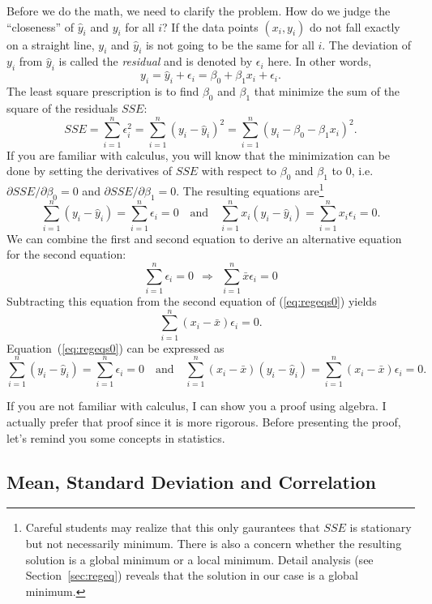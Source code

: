 \documentclass[11pt]{article}
\newcommand{\beq}{\begin{equation}}
\newcommand{\eeq}{\end{equation}}
\begin{document}
Before we do the math, we need to clarify the problem. How do we judge the 
``closeness'' of $\hat{y}_i$ and $y_i$ for all $i$? If the data points 
$(x_i,y_i)$ do not fall exactly on a straight line, $y_i$ and $\hat{y}_i$ 
is not going to be the same for all $i$. The deviation of $y_i$ from 
$\hat{y}_i$ is called the {\it residual} and is denoted by $\epsilon_i$ 
here. In other words, 
\beq
  y_i = \hat{y}_i + \epsilon_i = \beta_0 + \beta_1 x_i + \epsilon_i  .
\label{def:residual}
\eeq
The least square prescription is to find $\beta_0$ and $\beta_1$ that 
minimize the sum of the square of the residuals $SSE$: 
\beq
  SSE = \sum_{i=1}^n \epsilon_i^2 = \sum_{i=1}^n (y_i-\hat{y}_i)^2 
= \sum_{i=1}^n (y_i-\beta_0-\beta_1 x_i)^2 .
\label{def:SSE}
\eeq
If you are familiar with calculus, you will know that the minimization can be 
done by setting the derivatives of $SSE$ with respect to $\beta_0$ and 
$\beta_1$ to 0, i.e.\ $\partial SSE/\partial \beta_0 =0$ and 
$\partial SSE/\partial \beta_1=0$. The resulting equations 
are\footnote{Careful students may realize 
that this only gaurantees that $SSE$ is stationary but not necessarily minimum. There is also 
a concern whether the resulting solution is a global minimum or a local minimum. Detail 
analysis (see Section~\ref{sec:regeq}) reveals that the solution in our case is a global minimum.}  
\beq
  \sum_{i=1}^n (y_i-\hat{y}_i) = \sum_{i=1}^n \epsilon_i = 0 \ \ \ \mbox{ and } \ \ \ 
  \sum_{i=1}^n x_i (y_i-\hat{y}_i) = \sum_{i=1}^n x_i \epsilon_i = 0 .
\label{eq:regeqs0}
\eeq
We can combine the first and second equation to derive an alternative equation for 
the second equation: 
\[
  \sum_{i=1}^n \epsilon_i = 0 \ \ \Rightarrow \ \ 
  \sum_{i=1}^n \bar{x} \epsilon_i = 0 
\]
Subtracting this equation from the second equation of (\ref{eq:regeqs0}) yields 
\[
  \sum_{i=1}^n (x_i-\bar{x}) \epsilon_i = 0 .
\]
Equation~(\ref{eq:regeqs0}) can be expressed as 
\beq
  \sum_{i=1}^n (y_i-\hat{y}_i) = \sum_{i=1}^n \epsilon_i = 0 \ \ \ \mbox{ and } \ \ \ 
  \sum_{i=1}^n (x_i-\bar{x}) (y_i-\hat{y}_i) = \sum_{i=1}^n (x_i-\bar{x}) \epsilon_i = 0 .
\label{eq:regeqs}
\eeq

If you are not familiar with calculus, I can show you a proof using algebra. 
I actually prefer that proof since it is more rigorous. Before presenting the 
proof, let's remind you some concepts in statistics. 

\subsection{Mean, Standard Deviation and Correlation}
\end{document}
